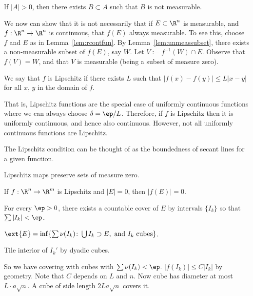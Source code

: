 \begin{lem} \label{lem:unmeassubset}
If $|A|>0$, then there exists $B \subset A$ such that $B$ is not measurable. 
\end{lem}




We now can show that it is not necessarily that if $E \subset \R^n$ is measurable, and $f: \R^n \to \R^n$ is continuous, that $f(E)$ always measurable. To see this, choose $f$ and $E$ as in Lemma~\ref{lem:rcontfun}. By Lemma~\ref{lem:unmeassubset}, there exists a non-measurable subset of $f(E)$, say $W$. Let $V:= f^{-1}(W) \cap E$. Observe that $f(V)=W$, and that $V$ is measurable (being a subset of measure zero). 

\begin{dfn}[Lipschitz]
We say that $f$ is Lipschitz if there exists $L$ such that $|f(x)-f(y)| \leq L|x-y|$ for all $x$, $y$ in the domain of $f$. 
\end{dfn}

That is, Lipschitz functions are the special case of uniformly continuous functions where we can always choose $\delta=\ep/L$. Therefore, if $f$ is Lipschitz then it is uniformly continuous, and hence also continuous. However, not all uniformly continuous functions are Lipschitz. 


The Lipschitz condition can be thought of as the boundedness of secant lines for a given function. 

Lipschitz maps preserve sets of measure zero.

\begin{thm} \label{thm:lipmeaszero}
If $f: \R^n \to \R^m$ is Lipschitz and $|E|=0$, then $|f(E)|=0$. 
\end{thm}

\pf For every $\ep>0$, there exists a countable cover of $E$ by intervals $\{I_k\}$ so that $\sum |I_k| < \ep$. 



$\ext{E}= \inf \{ \sum \nu(I_k) \colon \bigcup I_k \supset E, \text{ and }I_k \text{ cubes}\}$.

Tile interior of $I_k'$ by dyadic cubes. 

So we have covering with cubes with $\sum \nu(I_k)<\ep$. $|f(I_k)| \leq C |I_k|$ by geometry. Note that $C$ depends on $L$ and $n$. Now cube has diameter at most $L \cdot a \sqrt{n}$. A cube of side length $2L a \sqrt{n}$ covers it. 

